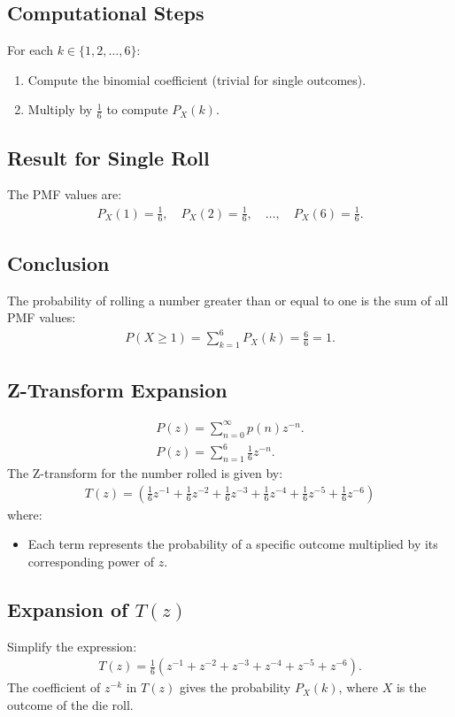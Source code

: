 \documentclass[journal]{IEEEtran}
\begin{document}
	\subsection*{Computational Steps}
	For each \(k \in \{1, 2, \dots, 6\}\):
	\begin{enumerate}
		\item Compute the binomial coefficient (trivial for single outcomes).
		\item Multiply by \(\frac{1}{6}\) to compute \(P_X(k)\).
	\end{enumerate}
	
	\subsection*{Result for Single Roll}
	The PMF values are:
	\begin{align}
		P_X(1) = \frac{1}{6}, \quad P_X(2) = \frac{1}{6}, \quad \dots, \quad P_X(6) = \frac{1}{6}.
	\end{align}
	
	\subsection*{Conclusion}
	The probability of rolling a number greater than or equal to one is the sum of all PMF values:
	\begin{align}
		P(X \geq 1) = \sum_{k=1}^{6} P_X(k) = \frac{6}{6} = 1.
	\end{align}
	\subsection*{Z-Transform Expansion}
	\begin{align}
		P(z) = \sum_{n=0}^{\infty} p(n) z^{-n}.\\
		P(z) = \sum_{n=1}^{6} \frac{1}{6} z^{-n}.
	\end{align}
	The Z-transform for the number rolled is given by:
	\begin{align}
		T(z) = \left( \frac{1}{6}z^{-1} + \frac{1}{6}z^{-2} + \frac{1}{6}z^{-3} + \frac{1}{6}z^{-4} + \frac{1}{6}z^{-5} + \frac{1}{6}z^{-6} \right)
	\end{align}
	where:
	\begin{itemize}
		\item Each term represents the probability of a specific outcome multiplied by its corresponding power of \(z\).
	\end{itemize}
	
	\subsection*{Expansion of \(T(z)\)}
	Simplify the expression:
	\begin{align}
		T(z) = \frac{1}{6}(z^{-1} + z^{-2} + z^{-3} + z^{-4} + z^{-5} + z^{-6}).
	\end{align}
	The coefficient of \(z^{-k}\) in \(T(z)\) gives the probability \(P_X(k)\), where \(X\) is the outcome of the die roll.
\end{document}
